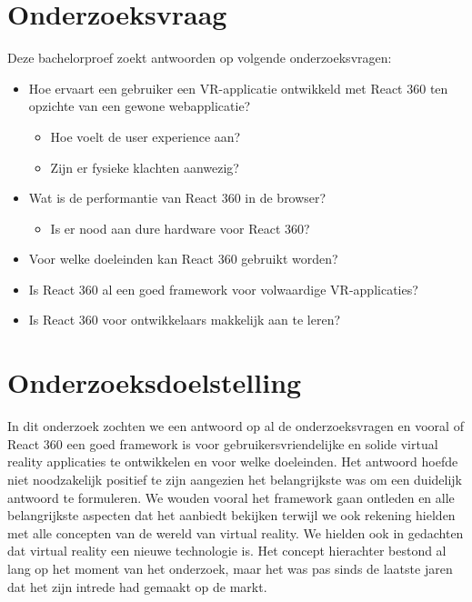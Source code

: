 \section{Onderzoeksvraag}
\label{sec:onderzoeksvraag}

Deze bachelorproef zoekt antwoorden op volgende onderzoeksvragen:
\begin{itemize}
  \item	Hoe ervaart een gebruiker een VR-applicatie ontwikkeld met React 360 ten opzichte van een gewone webapplicatie?
  \begin{itemize}
  \item	Hoe voelt de user experience aan?
  \item	Zijn er fysieke klachten aanwezig?
  \end{itemize}
  \item	Wat is de performantie van React 360 in de browser?
\begin{itemize}
	\item Is er nood aan dure hardware voor React 360?
\end{itemize}
  \item	Voor welke doeleinden kan React 360 gebruikt worden?
  \item	Is React 360 al een goed framework voor volwaardige VR-applicaties?
  \item Is React 360 voor ontwikkelaars makkelijk aan te leren?
\end{itemize}


\section{Onderzoeksdoelstelling}
\label{sec:onderzoeksdoelstelling}

In dit onderzoek zochten we een antwoord op al de onderzoeksvragen en vooral of React 360 een goed framework is voor gebruikersvriendelijke en solide virtual reality applicaties te ontwikkelen en voor welke doeleinden. Het antwoord hoefde niet noodzakelijk positief te zijn aangezien het belangrijkste was om een duidelijk antwoord te formuleren. We wouden vooral het framework gaan ontleden en alle belangrijkste aspecten dat het aanbiedt bekijken terwijl we ook rekening hielden met alle concepten van de wereld van virtual reality. We hielden ook in gedachten dat virtual reality een nieuwe technologie is. Het concept hierachter bestond al lang op het moment van het onderzoek, maar het was pas sinds de laatste jaren dat het zijn intrede had gemaakt op de markt.

